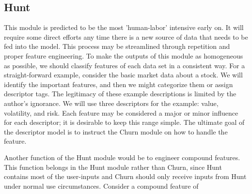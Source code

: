 \documentclass[letterpaper,12pt]{article}
\begin{document}
\subsection{Hunt}
This module is predicted to be the most 'human-labor' intensive early on. It will require some direct efforts any time there is a new source of data that needs to be fed into the model. This process may be streamlined through repetition and proper feature engineering. To make the outputs of this module as homogeneous as possible, we should classify features of each data set in a consistent way. For a straight-forward example, consider the basic market data about a stock. We will identify the important features, and then we might categorize them or assign descriptor tags. The legitimacy of these example descriptions is limited by the author's ignorance. We will use three descriptors for the example: value, volatility, and risk. Each feature may be considered a major or minor influence for each descriptor; it is desirable to keep this range simple. The ultimate goal of the descriptor model is to instruct the Churn module on how to handle the feature. 

Another function of the Hunt module would be to engineer compound features. This function belongs in the Hunt module rather than Churn, since Hunt contains most of the user-inputs and Churn should only receive inputs from Hunt under normal use circumstances. Consider a compound feature of 
\end{document}
